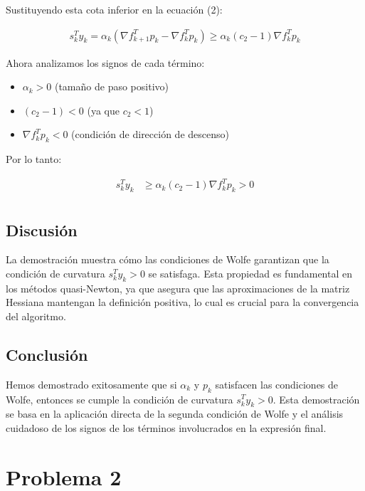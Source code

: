 \documentclass{article}
\begin{document}
Sustituyendo esta cota inferior en la ecuación (2):

\begin{align}
    s_k^Ty_k = \alpha_k(\nabla f_{k+1}^Tp_k - \nabla f_k^Tp_k) \geq \alpha_k(c_2 - 1) \nabla f_k^T p_k
\end{align}

Ahora analizamos los signos de cada término:

\begin{itemize}
    \item $\alpha_k > 0$ (tamaño de paso positivo)
    \item $(c_2 - 1) < 0$ (ya que $c_2 < 1$)
    \item $\nabla f_k^T p_k < 0$ (condición de dirección de descenso)
\end{itemize}

Por lo tanto:

\begin{align}
    s_k^Ty_k &\geq \alpha_k(c_2 - 1) \nabla f_k^T p_k > 0 \\
\end{align}

\subsection{Discusión}

La demostración muestra cómo las condiciones de Wolfe garantizan que la condición de curvatura $s_k^T y_k > 0$ se satisfaga. Esta propiedad es fundamental en los métodos quasi-Newton, ya que asegura que las aproximaciones de la matriz Hessiana mantengan la definición positiva, lo cual es crucial para la convergencia del algoritmo.

\subsection{Conclusión}

Hemos demostrado exitosamente que si $\alpha_k$ y $p_k$ satisfacen las condiciones de Wolfe, entonces se cumple la condición de curvatura $s_k^T y_k > 0$. Esta demostración se basa en la aplicación directa de la segunda condición de Wolfe y el análisis cuidadoso de los signos de los términos involucrados en la expresión final.

\section{Problema 2}
\end{document}
